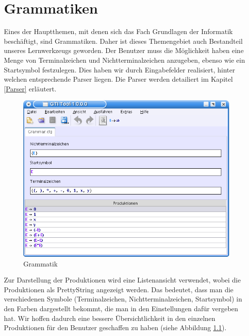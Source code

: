 

\chapter{Grammatiken}\label{Grammars}

Eines der Hauptthemen, mit denen sich das Fach Grundlagen der Informatik
beschäftigt, sind Grammatiken. Daher ist dieses Themengebiet auch Bestandteil
unseres Lernwerkzeugs geworden. Der Benutzer muss die Möglichkeit haben eine
Menge von Terminalzeichen und Nichtterminalzeichen anzugeben, ebenso wie ein
Startsymbol festzulegen. Dies haben wir durch Eingabefelder realisiert, hinter
welchen entsprechende Parser liegen. Die Parser werden detailiert im Kapitel
\ref{Parser} erläutert.\vspace{10pt}

\begin{figure}[h!]
\begin{center}
\includegraphics[width=12cm]{../images/cfg_example.png}
\caption{Grammatik}
\label{FigureProduction}
\end{center}
\end{figure}
\vspace{10pt}

Zur Darstellung der Produktionen wird
eine Listenansicht verwendet, wobei die Produktionen als PrettyString
angezeigt werden. Das bedeutet, dass man die verschiedenen Symbole
(Terminalzeichen, Nichtterminalzeichen, Startsymbol) in den Farben dargestellt
bekommt, die man in den Einstellungen dafür vergeben hat. Wir hoffen dadurch
eine bessere Übersichtlichkeit in den einzelnen Produktionen für den Benutzer
geschaffen zu haben (siehe Abbildung \ref{FigureProduction}).\vspace{10pt}

